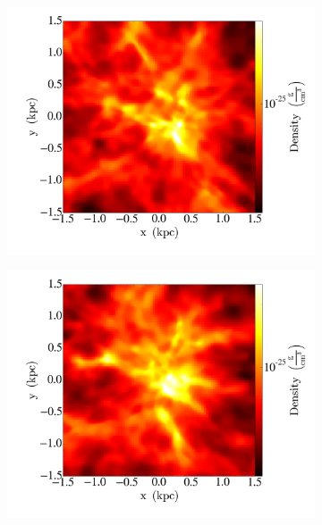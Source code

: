 \documentclass[12pt,a4paper]{article}
\begin{document}
\begin{figure}
   \centering
   \begin{subfigure}[b]{0.48\textwidth}
       \includegraphics[width=\textwidth]{../kuvat/flythrough/0000.png}
   \end{subfigure}
   \begin{subfigure}[b]{0.48\textwidth}
       \includegraphics[width=\textwidth]{../kuvat/flythrough/0032.png}
   \end{subfigure}
   \begin{subfigure}[b]{0.48\textwidth}

\end{subfigure}
\end{figure}
\end{document}
